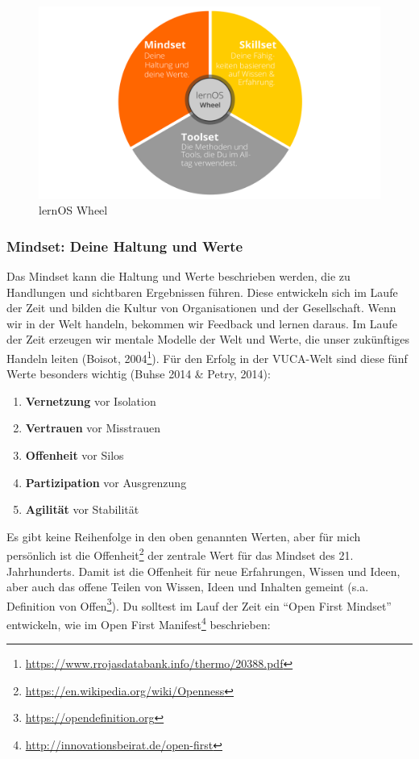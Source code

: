 \documentclass[
  ngerman,
  paper=a4,
,captions=tableheading
]{scrartcl}
\DeclareRobustCommand{\href}[2]{#2\footnote{\url{#1}}}
\providecommand{\tightlist}{%
  \setlength{\itemsep}{0pt}\setlength{\parskip}{0pt}}
\begin{document}
\begin{figure}
\centering
\includegraphics{./tex2pdf.-c0ed5a8631023970/bd77dc0df1ce1b6dae68b830db7f4902bd9b84b4.png}
\caption{lernOS Wheel}
\end{figure}

\hypertarget{mindset-deine-haltung-und-werte}{%
\subsubsection{Mindset: Deine Haltung und
Werte}\label{mindset-deine-haltung-und-werte}}

Das Mindset kann die Haltung und Werte beschrieben werden, die zu
Handlungen und sichtbaren Ergebnissen führen. Diese entwickeln sich im
Laufe der Zeit und bilden die Kultur von Organisationen und der
Gesellschaft. Wenn wir in der Welt handeln, bekommen wir Feedback und
lernen daraus. Im Laufe der Zeit erzeugen wir mentale Modelle der Welt
und Werte, die unser zukünftiges Handeln leiten
(\href{https://www.rrojasdatabank.info/thermo/20388.pdf}{Boisot, 2004}).
Für den Erfolg in der VUCA-Welt sind diese fünf Werte besonders wichtig
(Buhse 2014 \& Petry, 2014):

\begin{enumerate}
\def\labelenumi{\arabic{enumi}.}
\tightlist
\item
  \textbf{Vernetzung} vor Isolation
\item
  \textbf{Vertrauen} vor Misstrauen
\item
  \textbf{Offenheit} vor Silos
\item
  \textbf{Partizipation} vor Ausgrenzung
\item
  \textbf{Agilität} vor Stabilität
\end{enumerate}

Es gibt keine Reihenfolge in den oben genannten Werten, aber für mich
persönlich ist die
\href{https://en.wikipedia.org/wiki/Openness}{Offenheit} der zentrale
Wert für das Mindset des 21. Jahrhunderts. Damit ist die Offenheit für
neue Erfahrungen, Wissen und Ideen, aber auch das offene Teilen von
Wissen, Ideen und Inhalten gemeint (s.a.
\href{https://opendefinition.org}{Definition von Offen}). Du solltest im
Lauf der Zeit ein ``Open First Mindset'' entwickeln, wie im
\href{http://innovationsbeirat.de/open-first}{Open First Manifest}
beschrieben:
\end{document}
